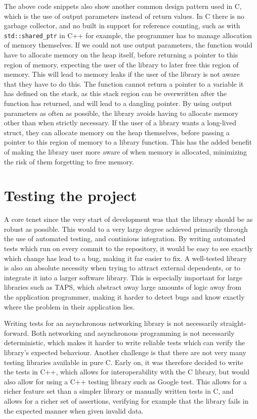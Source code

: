 The above code snippets also show another common design pattern used in C, which
is the use of output parameters instead of return values. In C there is no garbage
collector, and no built in support for reference counting, such as with \texttt{std::shared\_ptr}
in C++ for example, the programmer has to manage allocation of memory themselves.
If we could not use output parameters, the function would have to allocate memory on
the heap itself, before returning a pointer to this region of memory, expecting the
user of the library to later free this region of memory. 
This will lead to memory leaks
if the user of the library is not aware that they have to do this. 
The function cannot
return a pointer to a variable it has defined on the stack, as this stack
region can be overwritten after the function has returned, and will lead to a dangling
pointer.
By using output parameters as often as possible, the library avoids having to
allocate memory other than when strictly necessary. If the user of a library
wants a long-lived struct, they can allocate memory on the heap themselves, before
passing a pointer to this region of memory to a library function. This has
the added benefit of making the library user more aware of when memory is allocated,
minimizing the risk of them forgetting to free memory.

\section{Testing the project} \label{testingTheProject}
A core tenet since the very start of development was that the library should be
as robust as possible. This would to a very large degree achieved primarily through
the use of automated testing, and continious integration. By writing automated tests
which run on every commit to the repository, it would be easy to see exactly which change
has lead to a bug, making it far easier to fix. A well-tested library is also an absolute
necessity when trying to attract external dependents, or to integrate it into a larger software
library. This is especially important for large libraries such as TAPS, which abstract away
large amounts of logic away from the application programmer, making it harder to detect bugs
and know exactly where the problem in their application lies.

Writing tests for an asynchronous networking library is not necessarily straight-forward.
Both networking and asynchronous programming is not necessarily deterministic, which makes
it harder to write reliable tests which can verify the library's expected behaviour. Another
challenge is that there are not very many testing libraries available in pure C. Early on,
it was therefore decided to write the tests in C++, which allows for interoperability with the C
library, but would also allow for using a C++ testing library such as Google test. \cite{GoogleTest2025}
This allows for a richer feature set than a simpler library or manually written tests in C,
and allows for a richer set of assertions, verifying for example that the library fails in the expected
manner when given invalid data.

